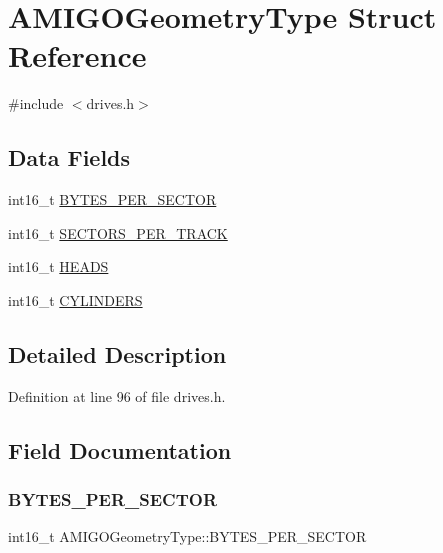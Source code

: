 \hypertarget{structAMIGOGeometryType}{}\section{A\+M\+I\+G\+O\+Geometry\+Type Struct Reference}
\label{structAMIGOGeometryType}


{\ttfamily \#include $<$drives.\+h$>$}

\subsection*{Data Fields}
\begin{DoxyCompactItemize}
\item 
int16\+\_\+t \hyperlink{structAMIGOGeometryType_a446d9194981ebd7af3c1b11cdbdf0cfd}{B\+Y\+T\+E\+S\+\_\+\+P\+E\+R\+\_\+\+S\+E\+C\+T\+OR}
\item 
int16\+\_\+t \hyperlink{structAMIGOGeometryType_ac19c5a32ffb2f05ebb00c64cac0903ee}{S\+E\+C\+T\+O\+R\+S\+\_\+\+P\+E\+R\+\_\+\+T\+R\+A\+CK}
\item 
int16\+\_\+t \hyperlink{structAMIGOGeometryType_a0c058525ff9c043708a0773eec513dbf}{H\+E\+A\+DS}
\item 
int16\+\_\+t \hyperlink{structAMIGOGeometryType_a5a0d5f6611aeb7db58ff4a851bde8fcf}{C\+Y\+L\+I\+N\+D\+E\+RS}
\end{DoxyCompactItemize}


\subsection{Detailed Description}


Definition at line 96 of file drives.\+h.



\subsection{Field Documentation}
\mbox{\label{structAMIGOGeometryType_a446d9194981ebd7af3c1b11cdbdf0cfd}} 
\subsubsection{\texorpdfstring{B\+Y\+T\+E\+S\+\_\+\+P\+E\+R\+\_\+\+S\+E\+C\+T\+OR}{BYTES\_PER\_SECTOR}}
{\footnotesize\ttfamily int16\+\_\+t A\+M\+I\+G\+O\+Geometry\+Type\+::\+B\+Y\+T\+E\+S\+\_\+\+P\+E\+R\+\_\+\+S\+E\+C\+T\+OR}



